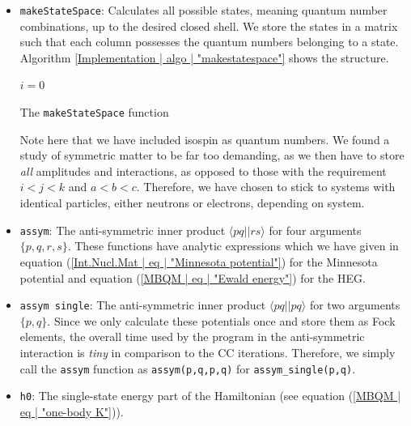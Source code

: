 \documentclass[10pt,twoside]{report}
\begin{document}
	\begin{itemize}
		\item \texttt{makeStateSpace}: Calculates all possible states, meaning quantum number combinations, up to the desired closed shell. We store the states in a matrix such that each column possesses the quantum numbers belonging to a state. Algorithm \ref{Implementation | algo | "makestatespace"} shows the structure.
		
		\begin{algorithm}[H]
			$i=0$\;
			\BlankLine
			\BlankLine
		\caption{The \texttt{makeStateSpace} function}
		\label{Implementation | algo | "makestatespace"}
		\end{algorithm}
		\BlankLine
		\BlankLine
		Note here that we have included isospin as quantum numbers. We found a study of symmetric matter to be far too demanding, as we then have to store \emph{all} amplitudes and interactions, as opposed to those with the requirement $i<j<k$ and $a<b<c$. Therefore, we have chosen to stick to systems with identical particles, either neutrons or electrons, depending on system.
		
		\item \texttt{assym}: The anti-symmetric inner product $\langle pq||rs\rangle$ for four arguments $\{p,q,r,s\}$. These functions have analytic expressions which we have given in equation (\ref{Int.Nucl.Mat | eq | "Minnesota potential"}) for the Minnesota potential and equation (\ref{MBQM | eq | "Ewald energy"}) for the HEG.
		
		\item \texttt{assym single}: The anti-symmetric inner product $\langle pq||pq\rangle$ for two arguments $\{p,q\}$. Since we only calculate these potentials once and store them as Fock elements, the overall time used by the program in the anti-symmetric interaction is \emph{tiny} in comparison to the CC iterations. Therefore, we simply call the \texttt{assym} function as \texttt{assym(p,q,p,q)} for \texttt{assym\_single(p,q)}.
		
		\item \texttt{h0}: The single-state energy part of the Hamiltonian (see equation (\ref{MBQM | eq | "one-body K"})).
		

\end{itemize}
\end{document}
